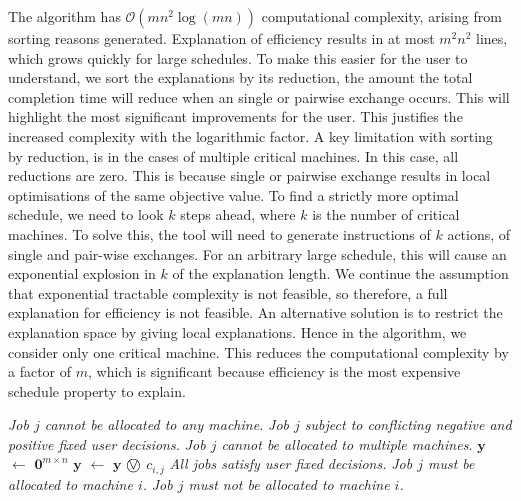 The algorithm has $\mathcal{O}(mn^2\log(mn))$ computational complexity, arising from sorting reasons generated. Explanation of efficiency results in at most $m^2n^2$ lines, which  grows quickly for large schedules. To make this easier for the user to understand, we sort the explanations by its reduction, the amount the total completion time will reduce when an  single or pairwise exchange occurs. This will highlight the most significant improvements for the user. This justifies the increased complexity with the logarithmic factor.
\linespace
A key limitation with sorting by reduction, is in the cases of multiple critical machines. In this case, all reductions are zero. This is because single or pairwise exchange results in local optimisations of the same objective value. To find a strictly more optimal schedule, we need to look $k$ steps ahead, where $k$ is the number of critical machines. To solve this, the tool will need to generate instructions of $k$ actions, of single and pair-wise exchanges. For an arbitrary large schedule, this will cause an exponential explosion in $k$ of the explanation length. We continue the assumption that exponential tractable complexity is not feasible, so therefore, a full explanation for efficiency is not feasible.
\linespace
An alternative solution is to restrict the explanation space by giving local explanations. Hence in the algorithm, we consider only one critical machine. This reduces the computational complexity by a factor of $m$, which is significant because efficiency is the most expensive schedule property to explain.

\begin{algorithm}[H]
	\caption{}
	\begin{algorithmic}[1]
					\State\emph{Job $j$ cannot be allocated to any machine.}
				\EndIf
					\State\emph{Job $j$ subject to conflicting negative and positive fixed user decisions.}
				\EndIf
					\State\emph{Job $j$ cannot be allocated to multiple machines.}	
				\EndIf
			\EndFor
			\State $\mathbf{y}$ $\gets$ $\mathbf{0}^{m\times n}$
					\State $\mathbf{y}$ $\gets$ $\mathbf{y}$ $\incircbin{\lor}$ $c_{i,j}$
				\EndFor
			\EndFor
				\State\emph{All jobs satisfy user fixed decisions.}
			\Else
							\State\emph{Job $j$ must be allocated to machine $i$.}
						\EndIf
							\State\emph{Job $j$ must not be allocated to machine $i$.}
						\EndIf			
					\EndFor
				\EndFor
			\EndIf
		\EndFunction
	\end{algorithmic}
\end{algorithm}


